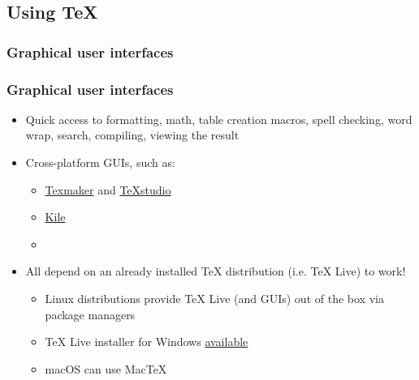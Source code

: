 \documentclass[xetex,colorlinks]{beamer} %
\begin{document}
  \subsection{Using \TeX{}}
  \subsubsection{Graphical user interfaces}
  \begin{frame}
    \frametitle{Graphical user interfaces}
    \begin{itemize}
     \item Quick access to formatting, math, table creation macros, spell checking, word wrap, search, compiling, viewing the result
     \item Cross-platform GUIs, such as:
     \begin{itemize}
      \item \href{http://www.xm1math.net/texmaker/}{Texmaker} and \href{http://www.texstudio.org/}{TeXstudio}
      \item \href{http://kile.sourceforge.net/}{Kile}
      \item \href{https://www.lyx.org/}{}
     \end{itemize}
     \item All depend on an already installed \TeX{} distribution (i.e. \TeX{} Live) to work!
     \begin{itemize}
      \item Linux distributions provide \TeX{} Live (and GUIs) out of the box via package managers
      \item \TeX{} Live installer for Windows \href{https://www.tug.org/texlive/acquire-netinstall.html}{available}
      \item macOS can use Mac\TeX{}
     \end{itemize}
    \end{itemize}
  \end{frame}
  
\end{document}
